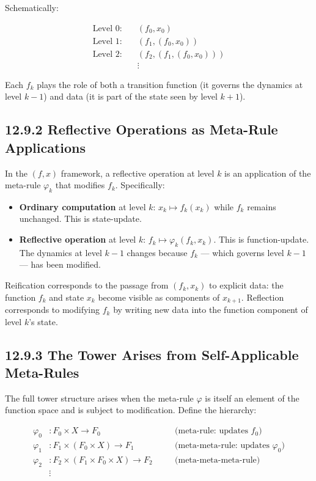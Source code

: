 Schematically:

$$\begin{aligned}
\text{Level 0:} \quad & (f_0, x_0) \\
\text{Level 1:} \quad & (f_1, (f_0, x_0)) \\
\text{Level 2:} \quad & (f_2, (f_1, (f_0, x_0))) \\
& \vdots
\end{aligned}$$

Each $f_k$ plays the role of both a transition function (it governs the dynamics at level $k - 1$) and data (it is part of the state seen by level $k + 1$).

\subsection{12.9.2 Reflective Operations as Meta-Rule Applications}

In the $(f, x)$ framework, a reflective operation at level $k$ is an application of the meta-rule $\varphi_k$ that modifies $f_k$. Specifically:

\begin{itemize}
  \item \textbf{Ordinary computation} at level $k$: $x_k \mapsto f_k(x_k)$ while $f_k$ remains unchanged. This is state-update.
  \item \textbf{Reflective operation} at level $k$: $f_k \mapsto \varphi_k(f_k, x_k)$. This is function-update. The dynamics at level $k - 1$ changes because $f_k$ --- which governs level $k - 1$ --- has been modified.
\end{itemize}

Reification corresponds to the passage from $(f_k, x_k)$ to explicit data: the function $f_k$ and state $x_k$ become visible as components of $x_{k+1}$. Reflection corresponds to modifying $f_k$ by writing new data into the function component of level $k$'s state.

\subsection{12.9.3 The Tower Arises from Self-Applicable Meta-Rules}

The full tower structure arises when the meta-rule $\varphi$ is itself an element of the function space and is subject to modification. Define the hierarchy:

$$\begin{aligned}
\varphi_0 &: F_0 \times X \to F_0 & \quad & \text{(meta-rule: updates } f_0\text{)} \\
\varphi_1 &: F_1 \times (F_0 \times X) \to F_1 & \quad & \text{(meta-meta-rule: updates } \varphi_0\text{)} \\
\varphi_2 &: F_2 \times (F_1 \times F_0 \times X) \to F_2 & \quad & \text{(meta-meta-meta-rule)} \\
& \vdots
\end{aligned}$$

